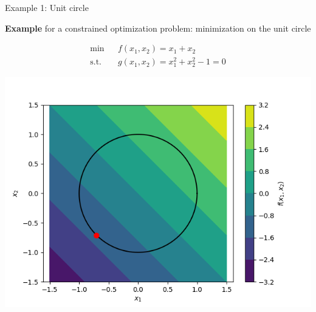 \begin{vbframe}{Example 1: Unit circle}


\textbf{Example} for a constrained optimization problem: minimization on the unit circle

\begin{eqnarray*}
  \min && f(x_1, x_2) = x_1 + x_2 \\
  \text{s.t. } && g(x_1,x_2) = x_1^2 + x_2^2 - 1 = 0
\end{eqnarray*}

\begin{center}
  \includegraphics[height=0.3\textwidth, keepaspectratio]{figure_man/unit_circle.png} \\
\end{center}

\end{vbframe}



